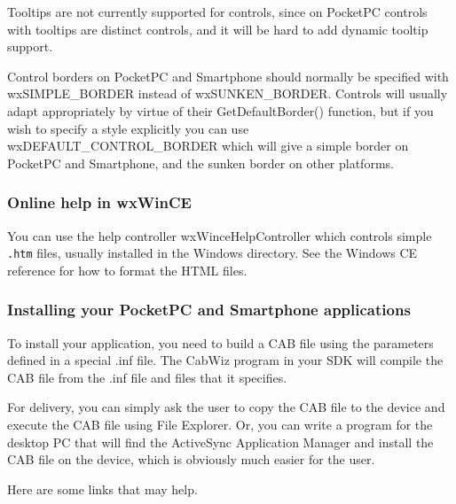 Tooltips are not currently supported for controls, since on PocketPC controls with
tooltips are distinct controls, and it will be hard to add dynamic
tooltip support.

Control borders on PocketPC and Smartphone should normally be specified with
wxSIMPLE\_BORDER instead of wxSUNKEN\_BORDER. Controls will usually adapt
appropriately by virtue of their GetDefaultBorder() function, but if you
wish to specify a style explicitly you can use wxDEFAULT\_CONTROL\_BORDER
which will give a simple border on PocketPC and Smartphone, and the sunken border on
other platforms.

\subsubsection{Online help in wxWinCE}

You can use the help controller wxWinceHelpController which controls
simple {\tt .htm} files, usually installed in the Windows directory.
See the Windows CE reference for how to format the HTML files.

\subsubsection{Installing your PocketPC and Smartphone applications}

To install your application, you need to build a CAB file using
the parameters defined in a special .inf file. The CabWiz program
in your SDK will compile the CAB file from the .inf file and
files that it specifies.

For delivery, you can simply ask the user to copy the CAB file to the
device and execute the CAB file using File Explorer. Or, you can
write a program for the desktop PC that will find the ActiveSync
Application Manager and install the CAB file on the device,
which is obviously much easier for the user.

Here are some links that may help.

